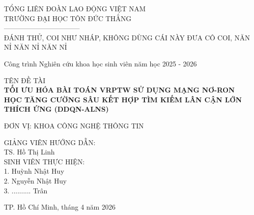 \documentclass[13pt, a4paper]{extarticle} %
\begin{document}
\begin{titlepage}
    \thispagestyle{empty} %
    \begin{center}
        TỔNG LIÊN ĐOÀN LAO ĐỘNG VIỆT NAM \\
        TRƯỜNG ĐẠI HỌC TÔN ĐỨC THẮNG \\
        --------------------------------- \\
        \vspace{2.5cm}
            ĐÁNH THỬ, COI NHƯ NHÁP, KHÔNG DÙNG CÁI NÀY ĐƯA CÔ COI, NĂN NỈ NĂN NỈ NĂN NỈ
            \vspace{1.5cm}
        
        Công trình Nghiên cứu khoa học sinh viên năm học 2025 - 2026 \\
        \vspace{1.5cm}
        
        TÊN ĐỀ TÀI \\
        \vspace{0.5cm}
        \textbf{\Large TỐI ƯU HÓA BÀI TOÁN VRPTW SỬ DỤNG MẠNG NƠ-RON HỌC TĂNG CƯỜNG SÂU KẾT HỢP TÌM KIẾM LÂN CẬN LỚN THÍCH ỨNG (DDQN-ALNS)} \\
        \vspace{1.5cm}
        
        ĐƠN VỊ: KHOA CÔNG NGHỆ THÔNG TIN
        \vspace{2.5cm}
    \end{center}
    
    \begin{flushleft}
        GIẢNG VIÊN HƯỚNG DẪN: \\
        TS. Hồ Thị Linh \\
        \vspace{0.8cm}
        SINH VIÊN THỰC HIỆN: \\
        1. Huỳnh Nhật Huy \\
        2. Nguyễn Nhật Huy \\
        3. .......... Trân

    \end{flushleft}
    
    \vfill
    \begin{center}
        TP. Hồ Chí Minh, tháng 4 năm 2026
    \end{center}
\end{titlepage}

\newpage
\setcounter{page}{1}

\end{document}
